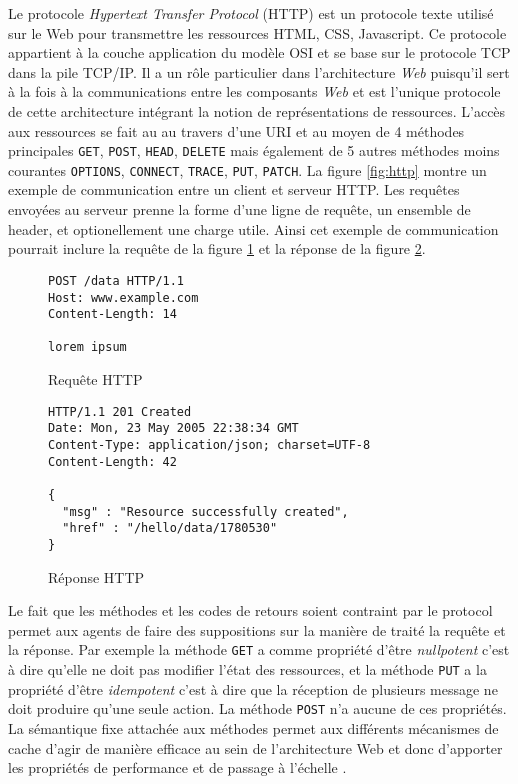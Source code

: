 \documentclass[a4paper, 11pt]{report}
\begin{document}
Le protocole \emph{Hypertext Transfer Protocol} (HTTP) est un
protocole texte utilisé sur le Web pour transmettre les ressources
HTML, CSS, Javascript.  Ce protocole appartient à la couche
application du modèle OSI et se base sur le protocole TCP dans la pile
TCP/IP. Il a un rôle particulier dans l'architecture \emph{Web}
puisqu'il sert à la fois à la communications entre les composants
\emph{Web} et est l'unique protocole de cette architecture intégrant
la notion de représentations de ressources.  L'accès aux ressources se
fait au au travers d'une URI et au moyen de 4 méthodes principales
\verb=GET=, \verb=POST=, \verb=HEAD=, \verb=DELETE= mais également de
5 autres méthodes moins courantes \verb=OPTIONS=, \verb=CONNECT=,
\verb=TRACE=, \verb=PUT=, \verb=PATCH=.  La figure \ref{fig:http}
montre un exemple de communication entre un client et serveur HTTP.
Les requêtes envoyées au serveur prenne la forme d'une ligne de
requête, un ensemble de header, et optionellement une charge utile.
Ainsi cet exemple de communication pourrait inclure la requête de la
figure \ref{fig:httpreq} et la réponse de la figure \ref{fig:httpres}.

\begin{figure}[h]
\begin{verbatim}
POST /data HTTP/1.1
Host: www.example.com
Content-Length: 14

lorem ipsum
\end{verbatim}
\caption{Requête HTTP}
\label{fig:httpreq}
\end{figure}

\begin{figure}[h]
\begin{verbatim}
HTTP/1.1 201 Created
Date: Mon, 23 May 2005 22:38:34 GMT
Content-Type: application/json; charset=UTF-8
Content-Length: 42

{
  "msg" : "Resource successfully created",
  "href" : "/hello/data/1780530"
}
\end{verbatim}
\caption{Réponse HTTP}
\label{fig:httpres}
\end{figure}

Le fait que les méthodes et les codes de retours soient contraint par
le protocol permet aux agents de faire des suppositions sur la manière
de traité la requête et la réponse.  Par exemple la méthode \verb=GET=
a comme propriété d'être \emph{nullpotent} c'est à dire qu'elle ne
doit pas modifier l'état des ressources, et la méthode \verb=PUT= a la
propriété d'être \emph{idempotent} c'est à dire que la réception de
plusieurs message ne doit produire qu'une seule action.  La méthode
\verb=POST= n'a aucune de ces propriétés.  La sémantique fixe attachée
aux méthodes permet aux différents mécanismes de cache d'agir de
manière efficace au sein de l'architecture Web et donc d'apporter les
propriétés de performance et de passage à l'échelle
\cite{fielding1999hypertext}.
\end{document}
